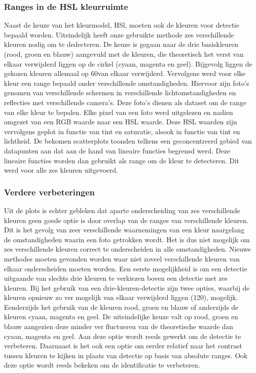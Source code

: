 \subsubsection{Ranges in de HSL kleurruimte}
Naast de keuze van het kleurmodel, HSl, moeten ook de kleuren voor detectie bepaald worden. Uiteindelijk heeft onze gebruikte methode zes verschillende kleuren nodig om te dedecteren. De keuze is gegaan naar de drie basiskleuren (rood, groen en blauw) aangevuld met de kleuren, die theoretisch het verst van elkaar verwijderd liggen op de cirkel (cyaan, magenta en geel). Bijgevolg liggen de gekozen kleuren allemaal op 60\degree van elkaar verwijderd. Vervolgens werd voor elke kleur een range bepaald onder verschillende omstandigheden. Hiervoor zijn foto's genomen van verschillende schermen in verschillende lichtomstandigheden en reflecties met verschillende camera's. Deze foto's dienen als dataset om de range van elke kleur te bepalen. Elke pixel van een foto werd uitgelezen en nadien omgezet van een RGB waarde naar een HSL waarde. Deze HSL waarden zijn vervolgens geplot in functie van tint en saturatie, alsook in functie van tint en lichtheid. De bekomen scatterplots toonden telkens een geconcentreerd gebied van datapunten aan dat aan de hand van lineaire functies begrensd werd. Deze lineaire functies worden dan gebruikt als range om de kleur te detecteren. Dit werd voor alle zes kleuren uitgevoerd.

\subsubsection{Verdere verbeteringen}
Uit de plots is echter gebleken dat aparte onderscheiding van zes verschillende kleuren geen goede optie is door overlap van de ranges van verschillende kleuren. Dit is het gevolg van zeer verschillende waarnemingen van een kleur naargelang de omstandigheden waarin een foto getrokken wordt. Het is dus niet mogelijk om zes verschillende kleuren correct te onderscheiden in alle omstandigheden. Nieuwe methodes moeten gevonden worden waar niet zoveel verschillende kleuren van elkaar onderscheiden moeten worden. Een eerste mogelijkheid is om een detectie uitgaande van slechts drie kleuren te verkiezen boven een detectie met zes kleuren. Bij het gebruik van een drie-kleuren-detectie zijn twee opties, waarbij de kleuren opnieuw zo ver mogelijk van elkaar verwijderd liggen (120\degree),  mogelijk. Eenderzijds het gebruik van de kleuren rood, groen en blauw of anderzijds de kleuren cyaan, magenta en geel. De uiteindelijke keuze valt op rood, groen en blauw aangezien deze minder ver fluctueren van de theoretische waarde dan cyaan, magenta en geel. Aan deze optie wordt reeds gewerkt om de detectie te verbeteren. Daarnaast is het ook een optie om eerder relatief naar het contrast tussen kleuren te kijken in plaats van detectie op basis van absolute ranges. Ook deze optie wordt reeds bekeken om de identificatie te verbeteren.


